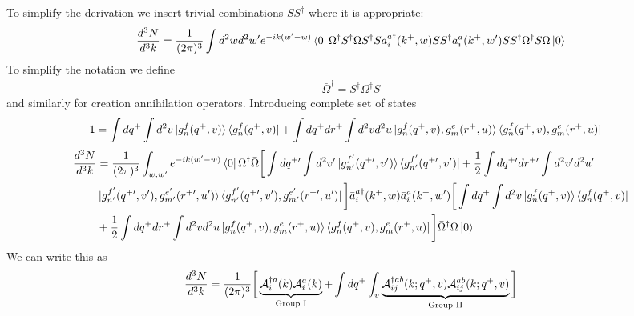 \documentclass[10pt]{article}
\numberwithin{equation}{section}
\begin{document}
To simplify the derivation we insert trivial combinations $S S^\dagger$ where it is appropriate: 
\begin{equation}
\frac{d^3  N}{d^3 k} = \frac{1}{(2\pi)^{3}}\int  d^{2}w d^{2} w^\prime 
e^{-ik (w^{\prime}-w)}
\bra{0}\Omega^{\dagger} S^{\dagger}\Omega  S^\dagger  S a^{a\dagger}_{i}(k^{+},w) 
 S S^\dagger a^{a}_{i} (k^{+} , w^\prime)  S S^\dagger  \Omega^{\dagger} S\Omega\ket{0}
\end{equation}
To simplify the notation we define 
\begin{align}
   \bar \Omega^\dagger =  S^\dagger \Omega^\dagger S  
\end{align}
and similarly for creation annihilation operators. Introducing complete set of states
\begin{align}
    \mathsf{1} & = \int dq^{+} \int d^{2}v \ket{g^{f}_{n}(q^{+},v)}\bra{g^{f}_{n}(q^{+},v)} + \int dq^{+} dr^{+} \int d^{2}v d^{2}u \ket{g^{f}_{n}(q^{+},v),g^{e}_{m}(r^{+},u)}\bra{g^{f}_{n}(q^{+},v),g^{e}_{m}(r^{+},u)}
\end{align}
\begin{align}
\frac{d^3  N}{d^3 k} &  = \frac{1}{(2\pi)^{3}}\int_{w,w^\prime} e^{-i k (w^{\prime}-w)}\bra{0}\Omega^{\dagger}\bar{\Omega} \bigg[ \int dq^{+\prime} \int d^{2}v^{\prime} \ket{g^{f^{\prime}}_{n^{\prime}}(q^{+\prime},v^{\prime})}\bra{g^{f^{\prime}}_{n^{\prime}}(q^{+\prime},v^{\prime})}  + \frac{1}{2}\int dq^{+\prime} dr^{+\prime} \int d^{2}v^{\prime} d^{2}u^{\prime} \notag \\ &\ket{g^{f^{\prime}}_{n^{\prime}}(q^{+\prime},v^{\prime}),g^{e^{\prime}}_{m^{\prime}}(r^{+\prime},u^{\prime})}\bra{g^{f^{\prime}}_{n^{\prime}}(q^{+\prime},v^{\prime}),g^{e^{\prime}}_{m^{\prime}}(r^{+\prime},u^{\prime})}\bigg]\bar a^{a\dagger }_{i} (k^{+} , w)\bar a^{a}_{i} (k^{+} , w^\prime)\bigg[ \int dq^{+} \int d^{2}v \ket{g^{f}_{n}(q^{+},v)}\bra{g^{f}_{n}(q^{+},v)} \notag \\ & + \frac{1}{2}\int dq^{+} dr^{+} \int d^{2}v d^{2}u \ket{g^{f}_{n}(q^{+},v),g^{e}_{m}(r^{+},u)}\bra{g^{f}_{n}(q^{+},v),g^{e}_{m}(r^{+},u)} \bigg]\bar \Omega^{\dagger} \Omega\ket{0}
\end{align}
We can write this as
\begin{equation}
    \frac{d^3  N}{d^3 k}   = \frac{1}{(2\pi)^{3}}\bigg[\underbrace{{\cal A}^{\dagger a}_{i}(k){\cal A}^{a}_{i}(k)}_{\text{Group I}} + 
    \int dq^+ \int_v
    \underbrace{{\cal A}^{\dagger ab}_{ij}(k; q^+, v){\cal A}^{ab}_{ij}(k; q^+, v)}_{\text{Group II}}\bigg]
\end{equation}
\end{document}
